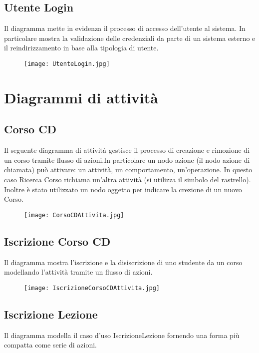 \documentclass[11pt,a4paper]{report}
\begin{document}
\subsection{Utente Login}
Il diagramma mette in evidenza il processo di accesso dell'utente al sistema. In particolare mostra la validazione delle credenziali da parte di un sistema esterno e il reindirizzamento in base alla tipologia di utente. 
\begin{figure}[h!]
  \centering
\texttt{[image: UtenteLogin.jpg]}
\end{figure}
\newpage


\section{Diagrammi di attività}
\subsection{Corso CD}
Il seguente diagramma di attività gestisce il processo di creazione e rimozione di un corso tramite flusso di azioni.In particolare un nodo azione (il nodo azione di chiamata) può attivare: un attività, un comportamento, un'operazione. In questo caso Ricerca Corso richiama un'altra attività (si utilizza il simbolo del rastrello). Inoltre è stato utilizzato un nodo oggetto per indicare la crezione di un nuovo Corso. 

\begin{figure}[h!]
  \centering
  \texttt{[image: CorsoCDAttivita.jpg]}
\end{figure}
\newpage
\subsection{Iscrizione Corso CD}
Il diagramma mostra l'iscrizione e la disiscrizione di uno studente da un corso modellando l'attività tramite un flusso di azioni. 

\begin{figure}[h!]
  \centering
  \texttt{[image: IscrizioneCorsoCDAttivita.jpg]}
\end{figure}
\newpage

\subsection{Iscrizione Lezione}
Il diagramma modella il caso d'uso IscrizioneLezione fornendo una forma più compatta come serie di azioni. 
\end{document}
